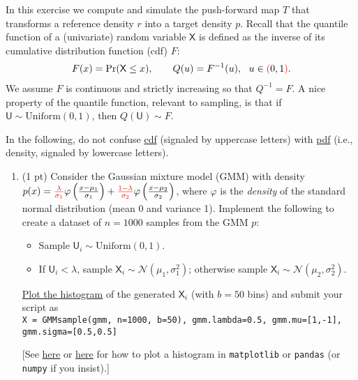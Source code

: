 \documentclass[10pt]{article}
\newcommand{\Usf}{\mathsf{U}}
\newcommand{\Xsf}{\mathsf{X}}
\newcommand{\ie}{{i.e.}\xspace}
\newcommand{\red}[1]{{\color{red}#1}}
\begin{document}
		
	\begin{exercise}
		In this exercise we compute and simulate the push-forward map $T$ that transforms a reference density $r$ into a target density $p$. Recall that the quantile function of a (univariate) random variable $\Xsf$ is defined as the inverse of its cumulative distribution function (cdf) $F$:
		\begin{align}
		F(x) = \Pr(\Xsf \leq x), \qquad
		Q(u) = F^{-1}(u),~~ u \in \red{(}0,1 \red{)}.
		\end{align}
		We assume $F$ is continuous and strictly increasing so that $Q^{-1} = F$. A nice property of the quantile function, relevant to sampling, is that if $\Usf \sim \mathrm{Uniform}(0,1)$, then $Q(\Usf) \sim F$.
		
		In the following, do not confuse \href{https://en.wikipedia.org/wiki/Cumulative_distribution_function}{cdf} (signaled by uppercase letters) with \href{https://en.wikipedia.org/wiki/Probability_density_function}{pdf} (\ie, density, signaled by lowercase letters).

		\begin{enumerate}
			\item (1 pt) Consider the Gaussian mixture model (GMM) with density $p(x) = \red{\tfrac{\lambda}{\sigma_1}} \varphi\left( \frac{x-\mu_1}{\sigma_1}\right) + \red{\tfrac{1-\lambda}{\sigma_2}} \varphi\left( \frac{x-\mu_2}{\sigma_2}\right)$, where $\varphi$ is the \emph{density} of the standard normal distribution (mean 0 and variance 1). Implement the following to create a dataset of $n=1000$ samples from the GMM $p$:
			\begin{itemize}
				\item Sample $\Usf_i\sim \mathrm{Uniform}(0,1)$. 
				\item If $\Usf_i < \lambda$, sample $\Xsf_i \sim \mathcal{N}(\mu_1, \sigma_1^{2})$; otherwise sample $\Xsf_i \sim \mathcal{N}(\mu_2, \sigma_2^{2})$.
			\end{itemize}
			\uline{Plot the histogram} of the generated $\Xsf_i$ (with $b=50$ bins) and submit your script as \\ \verb|X = GMMsample(gmm, n=1000, b=50), gmm.lambda=0.5, gmm.mu=[1,-1], gmm.sigma=[0.5,0.5]|
			
			[See \href{https://pythonspot.com/matplotlib-histogram/}{here} or \href{https://realpython.com/python-histograms/}{here} for how to plot a histogram in \verb|matplotlib| or \verb|pandas| (or \verb|numpy| if you insist).]
			

\end{enumerate}
\end{exercise}
\end{document}
